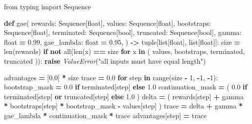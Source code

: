 \documentclass[
  american,
  11pt,
  letterpaper,
]{article}
\newenvironment{Shaded}{\begin{snugshade}}{\end{snugshade}}
\newcommand{\BuiltInTok}[1]{#1}
\newcommand{\ControlFlowTok}[1]{\textcolor[rgb]{0.13,0.29,0.53}{\textbf{#1}}}
\newcommand{\DecValTok}[1]{\textcolor[rgb]{0.00,0.00,0.81}{#1}}
\newcommand{\FloatTok}[1]{\textcolor[rgb]{0.00,0.00,0.81}{#1}}
\newcommand{\ImportTok}[1]{#1}
\newcommand{\KeywordTok}[1]{\textcolor[rgb]{0.13,0.29,0.53}{\textbf{#1}}}
\newcommand{\NormalTok}[1]{#1}
\newcommand{\OperatorTok}[1]{\textcolor[rgb]{0.81,0.36,0.00}{\textbf{#1}}}
\newcommand{\PreprocessorTok}[1]{\textcolor[rgb]{0.56,0.35,0.01}{\textit{#1}}}
\newcommand{\StringTok}[1]{\textcolor[rgb]{0.31,0.60,0.02}{#1}}
\renewenvironment{Shaded}{\par\smallskip}{\par\smallskip}
\begin{document}
\begin{Shaded}
\begin{Highlighting}[]
\ImportTok{from}\NormalTok{ typing }\ImportTok{import}\NormalTok{ Sequence}


\KeywordTok{def}\NormalTok{ gae(}
\NormalTok{    rewards: Sequence[}\BuiltInTok{float}\NormalTok{],}
\NormalTok{    values: Sequence[}\BuiltInTok{float}\NormalTok{],}
\NormalTok{    bootstraps: Sequence[}\BuiltInTok{float}\NormalTok{],}
\NormalTok{    terminated: Sequence[}\BuiltInTok{bool}\NormalTok{],}
\NormalTok{    truncated: Sequence[}\BuiltInTok{bool}\NormalTok{],}
\NormalTok{    gamma: }\BuiltInTok{float} \OperatorTok{=} \FloatTok{0.99}\NormalTok{,}
\NormalTok{    gae\_lambda: }\BuiltInTok{float} \OperatorTok{=} \FloatTok{0.95}\NormalTok{,}
\NormalTok{) }\OperatorTok{{-}\textgreater{}} \BuiltInTok{tuple}\NormalTok{[}\BuiltInTok{list}\NormalTok{[}\BuiltInTok{float}\NormalTok{], }\BuiltInTok{list}\NormalTok{[}\BuiltInTok{float}\NormalTok{]]:}
\NormalTok{    size }\OperatorTok{=} \BuiltInTok{len}\NormalTok{(rewards)}
    \ControlFlowTok{if} \KeywordTok{not} \BuiltInTok{all}\NormalTok{(}\BuiltInTok{len}\NormalTok{(x) }\OperatorTok{==}\NormalTok{ size }\ControlFlowTok{for}\NormalTok{ x }\KeywordTok{in}\NormalTok{ (}
\NormalTok{        values, bootstraps, terminated, truncated}
\NormalTok{    )):}
        \ControlFlowTok{raise} \PreprocessorTok{ValueError}\NormalTok{(}\StringTok{"all inputs must have equal length"}\NormalTok{)}

\NormalTok{    advantages }\OperatorTok{=}\NormalTok{ [}\FloatTok{0.0}\NormalTok{] }\OperatorTok{*}\NormalTok{ size}
\NormalTok{    trace }\OperatorTok{=} \FloatTok{0.0}
    \ControlFlowTok{for}\NormalTok{ step }\KeywordTok{in} \BuiltInTok{range}\NormalTok{(size }\OperatorTok{{-}} \DecValTok{1}\NormalTok{, }\OperatorTok{{-}}\DecValTok{1}\NormalTok{, }\OperatorTok{{-}}\DecValTok{1}\NormalTok{):}
\NormalTok{        bootstrap\_mask }\OperatorTok{=} \FloatTok{0.0} \ControlFlowTok{if}\NormalTok{ terminated[step] }\ControlFlowTok{else} \FloatTok{1.0}
\NormalTok{        continuation\_mask }\OperatorTok{=}\NormalTok{ (}
            \FloatTok{0.0} \ControlFlowTok{if}\NormalTok{ terminated[step] }\KeywordTok{or}\NormalTok{ truncated[step] }\ControlFlowTok{else} \FloatTok{1.0}
\NormalTok{        )}
\NormalTok{        delta }\OperatorTok{=}\NormalTok{ (}
\NormalTok{            rewards[step]}
            \OperatorTok{+}\NormalTok{ gamma }\OperatorTok{*}\NormalTok{ bootstraps[step] }\OperatorTok{*}\NormalTok{ bootstrap\_mask}
            \OperatorTok{{-}}\NormalTok{ values[step]}
\NormalTok{        )}
\NormalTok{        trace }\OperatorTok{=}\NormalTok{ delta }\OperatorTok{+}\NormalTok{ gamma }\OperatorTok{*}\NormalTok{ gae\_lambda }\OperatorTok{*}\NormalTok{ continuation\_mask }\OperatorTok{*}\NormalTok{ trace}
\NormalTok{        advantages[step] }\OperatorTok{=}\NormalTok{ trace}


\end{Highlighting}
\end{Shaded}
\end{document}
